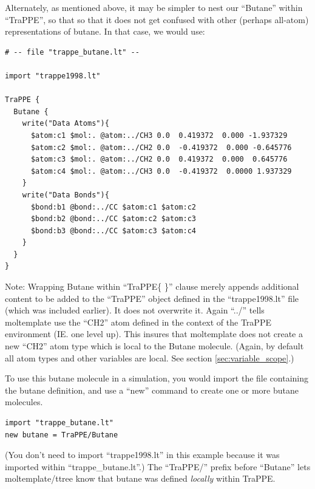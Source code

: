 \documentclass[11pt]{article}
\begin{document}

Alternately, as mentioned above, it may be simpler to nest our ``Butane'' 
within ``TraPPE'', so that so that it does not get confused with other
(perhaps all-atom) representations of butane.  In that case, we would use:
\begin{verbatim}
# -- file "trappe_butane.lt" --

import "trappe1998.lt"

TraPPE {
  Butane {
    write("Data Atoms"){
      $atom:c1 $mol:. @atom:../CH3 0.0  0.419372  0.000 -1.937329
      $atom:c2 $mol:. @atom:../CH2 0.0  -0.419372  0.000 -0.645776
      $atom:c3 $mol:. @atom:../CH2 0.0  0.419372  0.000  0.645776
      $atom:c4 $mol:. @atom:../CH3 0.0  -0.419372  0.0000 1.937329
    }
    write("Data Bonds"){
      $bond:b1 @bond:../CC $atom:c1 $atom:c2
      $bond:b2 @bond:../CC $atom:c2 $atom:c3
      $bond:b3 @bond:../CC $atom:c3 $atom:c4
    }
  }
}
\end{verbatim}
Note: Wrapping Butane within ``TraPPE\{ \}'' clause merely appends 
additional content to be added to the ``TraPPE'' object defined 
in the ``trappe1998.lt'' file (which was included earlier). 
It does not overwrite it. 
Again ``../'' tells moltemplate use the ``CH2'' atom 
defined in the context of the TraPPE environment (IE. one level up).
This insures that moltemplate does not create a new ``CH2'' atom type
which is local to the Butane molecule.  
(Again, by default all atom types and other variables are local.
See section \ref{sec:variable_scope}.)

To use this butane molecule in a simulation, 
you would import the file containing the butane definition,
and use a ``new'' command to create one or more butane molecules.
\begin{verbatim}
import "trappe_butane.lt"
new butane = TraPPE/Butane
\end{verbatim}
(You don't need to import ``trappe1998.lt'' in this example because
it was imported within ``trappe\_butane.lt''.)
The ``TraPPE/'' prefix before ``Butane'' lets moltemplate/ttree
know that butane was defined \textit{locally} within TraPPE.  
\end{document}
